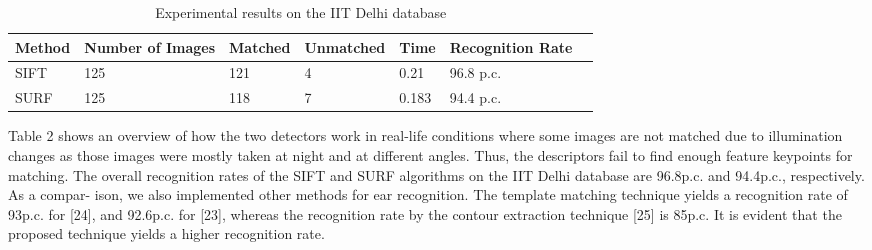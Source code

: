 \begin{table}[]
\centering
\caption{Experimental results on the IIT Delhi database}
\label{table2}
\begin{tabular}{lllllll}
\hline
\multicolumn{1}{c}{Method} &           
\multicolumn{1}{c}{Number of Images} &          
\multicolumn{1}{c}{Matched } &     
\multicolumn{1}{c}{Unmatched } &     
\multicolumn{1}{c}{Time} &     
\multicolumn{1}{c}{Recognition Rate} &     \\ \cline{1-2}
\hline
SIFT  & 125  & 121  & 4 & 0.21 & 96.8 p.c.  \\
\hline
SURF & 125  & 118  & 7 & 0.183 & 94.4 p.c.    \\
 \hline

\end{tabular}
\end{table}

Table 2 shows an overview of how the two detectors work in real-life conditions where some images are not matched due to illumination changes as those images were mostly taken at night and at different angles. Thus, the descriptors fail to find enough feature keypoints for matching. The overall recognition rates of the SIFT and SURF algorithms on the IIT Delhi database are 96.8p.c. and 94.4p.c., respectively. As a compar- ison, we also implemented other methods for ear recognition. The template matching technique yields a recognition rate of 93p.c. for [24], and 92.6p.c. for [23], whereas the recognition rate by the contour extraction technique [25] is 85p.c. It is evident that the proposed technique yields a higher recognition rate.
